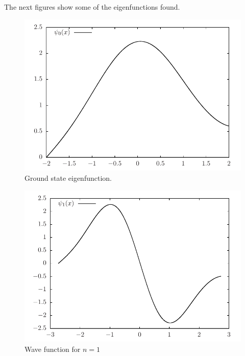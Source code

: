 \documentclass[11pt]{article}
\begin{document}
The next figures show some of the eigenfunctions found.
\begin{figure}[H]
  \centering
  \includegraphics[width=.7\linewidth]{schrodinger-n0}
  \caption{Ground state eigenfunction.}
  \label{fig:schrodinger-n0}
\end{figure}

\begin{figure}[H]
  \centering
  \includegraphics[width=.7\linewidth]{schrodinger-n1}
  \caption{Wave function for $n=1$}
  \label{fig:schrodinger-n1}
\end{figure}
\end{document}
